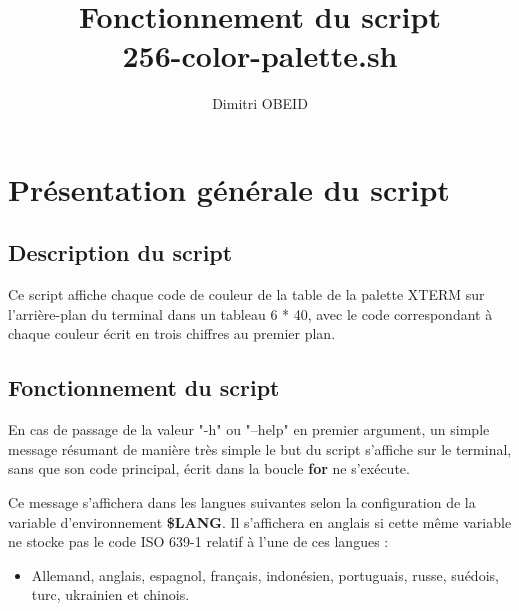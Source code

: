 \documentclass[a4paper,10pt]{article}
\title{\color{sec1}Fonctionnement du script\\ \textbf{\color{sec2}256-color-palette.sh}}\color{text}
\author{Dimitri OBEID}
\begin{document}
    \maketitle
    \newpage

    \hypertarget{contents}{}
    \tableofcontents
    \newpage

    \color{sec1}
    \section{Présentation générale du script}\color{text}

    \color{sec2}
    \subsection{Description du script}\color{text}

    \begin{justify}
        Ce script affiche chaque code de couleur de la table de la palette XTERM sur l'arrière-plan du terminal dans un tableau 6 * 40, avec le code correspondant à chaque couleur écrit en trois chiffres au premier plan.
    \end{justify}




    \color{sec2}
    \subsection{Fonctionnement du script}\color{text}

    \begin{justify}
        En cas de passage de la valeur "-h" ou "--help" en premier argument, un simple message résumant de manière très simple le but du script s'affiche sur le terminal, sans que son code principal, écrit dans la boucle \textbf{\color{loop}for} ne s'exécute.
    \end{justify}

    \begin{justify}
        Ce message s'affichera dans les langues suivantes selon la configuration de la variable d'environnement \textbf{\color{vars}\$LANG}. Il s'affichera en anglais si cette même variable ne stocke pas le code ISO 639-1 relatif à l'une de ces langues :
    \end{justify}

    \begin{justify}
        \begin{itemize}
            \item Allemand, anglais, espagnol, français, indonésien, portuguais, russe, suédois, turc, ukrainien et chinois.
        \end{itemize}

    \end{justify}
\end{document}
